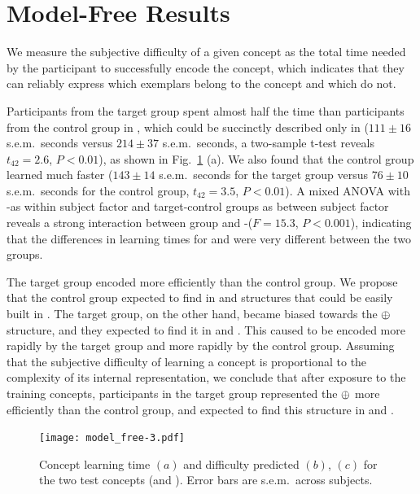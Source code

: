 \section{Model-Free Results}

We measure the subjective difficulty of a given concept as the total time needed by the participant to successfully encode the concept, which indicates that they can reliably express which exemplars belong to the concept and which do not.

Participants from the target group spent almost half the time than participants from the control group in \testa, which could be succinctly described only in \gramboolxor ($111\pm16$ s.e.m.\ seconds versus $214\pm37$ s.e.m.\ seconds, a two-sample t-test reveals $t_{42}=2.6$, $P<0.01$), as shown in Fig.~\ref{model free} (a). We also found that the control group learned much faster \testb ($143\pm14$ s.e.m.\ seconds for the target group versus $76\pm10$ s.e.m.\ seconds for the control group, $t_{42}=3.5$, $P<0.01$). A mixed ANOVA with \testa-\testb as within subject factor and target-control groups as between subject factor reveals a strong interaction between group and \testa-\testb ($F=15.3$, $P<0.001$), indicating that the differences in learning times for \testa and \testb were very different between the two groups.

The target group encoded \testa more efficiently than the control group. We propose that the control group expected to find in \testa and \testb structures that could be easily built in \grambool. The target group, on the other hand, became biased towards the $\oplus$ structure, and they expected to find it in \testa and \testb. This caused \testa to be encoded more rapidly by the target group and \testb more rapidly by the control group. Assuming that the subjective difficulty of learning a concept is proportional to the complexity of its internal representation, we conclude that after exposure to the training concepts, participants in the target group represented the $\oplus$ more efficiently than the control group, and expected to find this structure in \testa and \testb.



\begin{figure}[t!]
      \texttt{[image: model\_free-3.pdf]}
      \centering
      \caption{Concept learning time $(a)$ and difficulty predicted $(b)$, $(c)$ for the two test concepts (\testa and \testb). Error bars are s.e.m.\ across subjects.}
      \label{model free}
   \end{figure}
   
